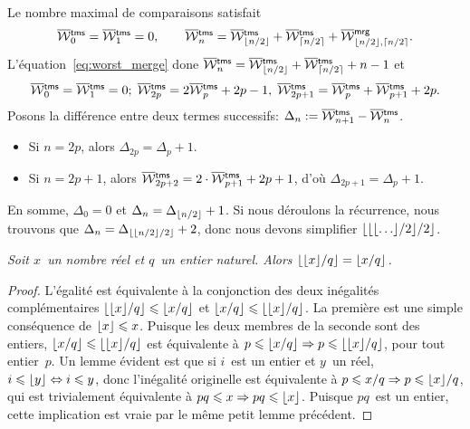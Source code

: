 Le nombre maximal de comparaisons satisfait
\begin{equation*}
\OW{\fun{tms}}{0} = \OW{\fun{tms}}{1} = 0,
\qquad
\OW{\fun{tms}}{n} = \OW{\fun{tms}}{\floor{n/2}}
+ \OW{\fun{tms}}{\ceiling{n/2}}
+ \OW{\fun{mrg}}{\floor{n/2},\ceiling{n/2}}.
\index{tms@$\OW{\fun{tms}}{n}$|(}
\index{mrg@\fun{mrg/2}}
\end{equation*}
L'équation~\eqref{eq:worst_merge}  done
\(\OW{\fun{tms}}{n} = \OW{\fun{tms}}{\floor{n/2}} +
\OW{\fun{tms}}{\ceiling{n/2}} + n - 1\) et
\begin{equation*}
\OW{\fun{tms}}{0} = \OW{\fun{tms}}{1} = 0;\;
\OW{\fun{tms}}{2p} = 2\OW{\fun{tms}}{p} + 2p - 1,\;
\OW{\fun{tms}}{2p+1} = \OW{\fun{tms}}{p} + \OW{\fun{tms}}{p+1} + 2p.
\end{equation*}
Posons la différence entre deux termes successifs: \(\Delta_n :=
\smash[t]{\OW{\fun{tms}}{n+1}} - \OW{\fun{tms}}{n}\).
\begin{itemize}

  \item Si \(n=2p\), alors \(\Delta_{2p} = \Delta_{p} + 1\).

  \item Si \(n=2p+1\), alors \(\OW{\fun{tms}}{2p+2} = 2 \cdot
  \OW{\fun{tms}}{p+1} + 2p + 1\), d'où \(\Delta_{2p+1} = \Delta_{p} +
  1\).

\end{itemize}
En somme, \(\Delta_0 = 0\) et \(\Delta_n = \Delta_{\lfloor{n/2}\rfloor} +
1\). Si nous déroulons la récurrence, nous trouvons que \(\Delta_n =
\Delta_{\lfloor{\lfloor{n/2}\rfloor/2}\rfloor}+ 2\), donc nous devons simplifier
\(\lfloor{\lfloor{\lfloor{\dots}\rfloor/2}\rfloor/2}\rfloor\).
\begin{thm}
\label{thm_floors}
\textsl{Soit \(x\)~un nombre réel et \(q\)~un entier naturel. Alors
  \(\lfloor{\lfloor{x}\rfloor/q}\rfloor = \lfloor{x/q}\rfloor\).}
\end{thm}
\begin{proof}
  L'égalité est équivalente à la conjonction des deux inégalités
  complémentaires \(\lfloor{\lfloor{x}\rfloor/q}\rfloor \leqslant \lfloor{x/q}\rfloor\) et
  \(\lfloor{x/q}\rfloor \leqslant \lfloor{\lfloor{x}\rfloor/q}\rfloor\). La première est une
  simple conséquence de \(\lfloor{x}\rfloor \leqslant x\). Puisque les deux
  membres de la seconde sont des entiers, \(\lfloor{x/q}\rfloor \leqslant
  \lfloor{\lfloor{x}\rfloor/q}\rfloor\) est équivalente à \(p \leqslant \lfloor{x/q}\rfloor
  \Rightarrow p \leqslant \lfloor{\lfloor{x}\rfloor/q}\rfloor\), pour tout
  entier~\(p\). Un lemme évident est que si \(i\)~est un entier et
  \(y\)~un réel, \(i \leqslant \lfloor{y}\rfloor \Leftrightarrow i
  \leqslant y\), donc l'inégalité originelle est équivalente à
  \(p \leqslant x/q \Rightarrow p \leqslant \lfloor{x}\rfloor/q\), qui est
  trivialement équivalente à \(pq \leqslant x \Rightarrow pq \leqslant
  \lfloor{x}\rfloor\). Puisque \(pq\)~est un entier, cette implication est
  vraie par le même petit lemme précédent.
\end{proof}
